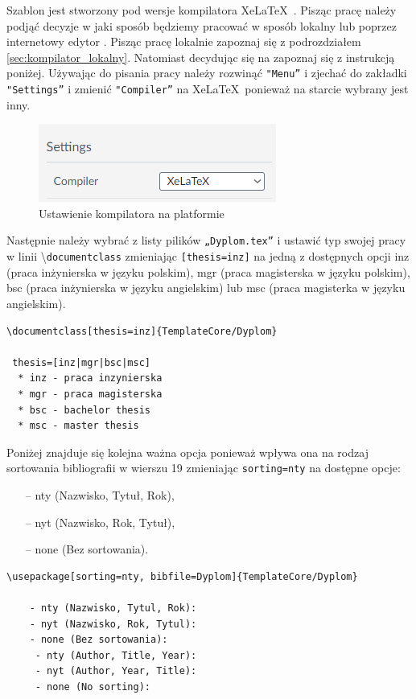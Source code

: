 
Szablon jest stworzony pod wersje kompilatora Xe\LaTeX\ . Pisząc pracę należy podjąć decyzje w jaki sposób będziemy pracować w sposób lokalny lub poprzez internetowy edytor \overleaflink. Pisząc pracę lokalnie zapoznaj się z podrozdziałem \ref{sec:kompilator_lokalny}. Natomiast decydując się na \overleaflink zapoznaj się z instrukcją poniżej. Używając \overleaflink do pisania pracy należy rozwinąć \texttt{"Menu”} i zjechać do zakładki \texttt{"Settings”} i zmienić \texttt{"Compiler”} na Xe\LaTeX\ ponieważ na starcie wybrany jest inny. 

\begin{figure}[!hb]
    \centering
    \includegraphics{IMAGE/Obraz1.png}
    \caption{Ustawienie kompilatora na platformie \overleaflink}
    
\end{figure}
Następnie należy wybrać z listy pilików \texttt{„Dyplom.tex”} i ustawić typ swojej pracy  w linii \textbackslash \texttt{documentclass} zmieniając \texttt{[thesis=inz]} na jedną z dostępnych opcji inz (praca inżynierska w języku polskim), mgr (praca magisterska w języku polskim), bsc (praca inżynierska w języku angielskim) lub msc (praca magisterka w języku angielskim). 
\begin{lstlisting}[caption={Ustawienia klasy dokumentu}, label=lst:Ustawienia klasy dokumentu, firstnumber=8]
\documentclass[thesis=inz]{TemplateCore/Dyplom}

 thesis=[inz|mgr|bsc|msc]
  * inz - praca inzynierska
  * mgr - praca magisterska
  * bsc - bachelor thesis
  * msc - master thesis
\end{lstlisting}
\clearpage
Poniżej znajduje się kolejna ważna opcja ponieważ wpływa ona na rodzaj sortowania bibliografii w wierszu 19 zmieniając \texttt{sorting=nty} na dostępne opcje: 
\begin{itemize}
\item[--] nty (Nazwisko, Tytuł, Rok),
\item[--] nyt (Nazwisko, Rok, Tytuł),
\item[--] none (Bez sortowania).
\end{itemize}
\begin{lstlisting}[caption={Ustawienia sortowania bibliografii}, label=lst:Ustawienia sortowania bibliografii, firstnumber=19]
	\usepackage[sorting=nty, bibfile=Dyplom]{TemplateCore/Dyplom} 
	
	- nty (Nazwisko, Tytul, Rok):
	- nyt (Nazwisko, Rok, Tytul):
	- none (Bez sortowania):
	 - nty (Author, Title, Year):
	 - nyt (Author, Year, Title):
	 - none (No sorting):

\end{lstlisting}
